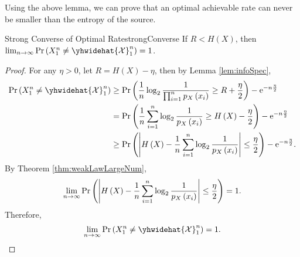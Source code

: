 \documentclass[math, code]{amznotes}
\theoremstyle{remark}
\newcommand{\e}{\mathrm{e}}
\begin{document}
Using the above lemma, we can prove that an optimal achievable rate can never be smaller than the entropy of the source.
\begin{thmbox}{Strong Converse of Optimal Rate}{strongConverse}
    If $R < H\left(X\right)$, then $\lim_{n \to \infty}\Pr\left(X_1^n \neq \yhwidehat{\mathcal{X}}_1^n\right) = 1$.
    \tcblower
    \begin{proof}
        For any $\eta > 0$, let $R = H\left(X\right) - \eta$, then by Lemma \ref{lem:infoSpec}, 
        \begin{align*}
            \Pr\left(X_1^n \neq \yhwidehat{\mathcal{X}}_1^n\right) & \geq \Pr\left(\frac{1}{n}\log_2\frac{1}{\prod_{i = 1}^np_X\left(x_i\right)} \geq R + \frac{\eta}{2}\right) - \e^{-n\frac{\eta}{2}} \\
            & = \Pr\left(\frac{1}{n}\sum_{i = 1}^{n}\log_2\frac{1}{p_X\left(x_i\right)} \geq H\left(X\right) - \frac{\eta}{2}\right) - \e^{-n\frac{\eta}{2}} \\
            & \geq \Pr\left(\abs{H\left(X\right) - \frac{1}{n}\sum_{i = 1}^{n}\log_2\frac{1}{p_X\left(x_i\right)}} \leq \frac{\eta}{2}\right) - \e^{-n\frac{\eta}{2}}.
        \end{align*}
        By Theorem \ref{thm:weakLawLargeNum}, 
        \begin{align*}
            \lim_{n \to \infty}\Pr\left({\left\lvert {H\left(X\right) - \frac{1}{n}\sum_{i = 1}^{n}\log_2\frac{1}{p_X\left(x_i\right)}} \right\rvert} \leq \frac{\eta}{2}\right) = 1.
        \end{align*}
        Therefore, 
        \begin{equation*}
            \lim_{n \to \infty}\Pr\left(X_1^n \neq \yhwidehat{\mathcal{X}}_1^n\right) = 1.
        \end{equation*}
    \end{proof}
\end{thmbox}
\end{document}
